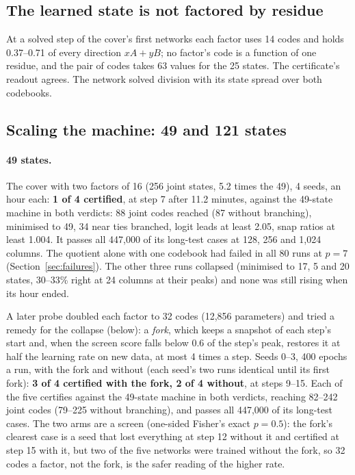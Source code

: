 \documentclass[11pt]{article}
\begin{document}
\subsection{The learned state is not factored by residue}
\label{sec:not-factored}

At a solved step of the cover's first networks each factor uses 14 codes and holds 0.37--0.71 of every
direction $xA + yB$; no factor's code is a function of one residue, and the pair of codes takes 63
values for the 25 states. The certificate's readout agrees. The network solved division with its
state spread over both codebooks.

\subsection{Scaling the machine: 49 and 121 states}
\label{sec:scaling}

\paragraph{49 states.}

The cover with two factors of 16 (256 joint states, 5.2 times the 49), 4 seeds, an hour each:
\textbf{1 of 4 certified}, at step 7 after 11.2 minutes, against the 49-state machine in both
verdicts: 88 joint codes reached (87 without branching), minimised to 49, 34 near ties branched,
logit leads at least 2.05, snap ratios at least 1.004. It passes all 447{,}000 of its long-test cases at 128, 256 and 1{,}024
columns. The
quotient alone with one codebook had failed in all 80 runs at $p = 7$ (Section~\ref{sec:failures}).
The other three runs collapsed (minimised to 17, 5 and 20 states, 30--33\% right at 24 columns at
their peaks) and none was still rising when its hour ended.

A later probe doubled each factor to 32 codes (12{,}856 parameters) and tried a remedy for the
collapse (below): a \emph{fork}, which keeps a snapshot of each step's start
and, when the screen score falls below 0.6 of the step's peak, restores it at half the learning rate
on new data, at most 4 times a step. Seeds 0--3, 400 epochs a run, with the fork and without (each
seed's two runs identical until its first fork): \textbf{3 of 4 certified with the fork, 2 of 4
without}, at steps 9--15. Each of the five certifies against the 49-state machine in both
verdicts, reaching 82--242 joint codes (79--225 without branching), and passes all 447{,}000 of its
long-test cases. The two arms are a screen (one-sided Fisher's exact $p = 0.5$): the fork's clearest
case is a seed that lost everything at step 12 without it and certified at step 15 with it, but two of
the five networks were trained without the fork, so 32 codes a factor, not the fork, is the safer
reading of the higher rate.
\end{document}
